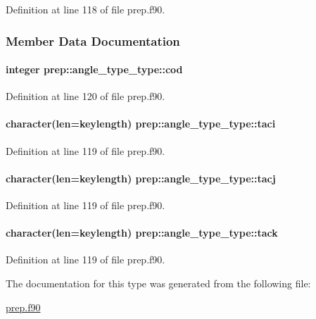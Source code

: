 Definition at line 118 of file prep.\-f90.



\subsubsection{Member Data Documentation}
\hypertarget{structprep_1_1angle__type__type_a48ee5c7c8c1e2b8ba3a29702e252b46a}{
\paragraph[{cod}]{\setlength{\rightskip}{0pt plus 5cm}integer prep\-::angle\-\_\-type\-\_\-type\-::cod}}\label{structprep_1_1angle__type__type_a48ee5c7c8c1e2b8ba3a29702e252b46a}


Definition at line 120 of file prep.\-f90.

\hypertarget{structprep_1_1angle__type__type_ac31a2b6fe772404151a3d6959862f5eb}{
\paragraph[{taci}]{\setlength{\rightskip}{0pt plus 5cm}character(len=keylength) prep\-::angle\-\_\-type\-\_\-type\-::taci}}\label{structprep_1_1angle__type__type_ac31a2b6fe772404151a3d6959862f5eb}


Definition at line 119 of file prep.\-f90.

\hypertarget{structprep_1_1angle__type__type_ad388c67349e6ca0e9de1bb11d2b6c1c1}{
\paragraph[{tacj}]{\setlength{\rightskip}{0pt plus 5cm}character(len=keylength) prep\-::angle\-\_\-type\-\_\-type\-::tacj}}\label{structprep_1_1angle__type__type_ad388c67349e6ca0e9de1bb11d2b6c1c1}


Definition at line 119 of file prep.\-f90.

\hypertarget{structprep_1_1angle__type__type_acc5fb535d5018f01dead7ef4ced2e7da}{
\paragraph[{tack}]{\setlength{\rightskip}{0pt plus 5cm}character(len=keylength) prep\-::angle\-\_\-type\-\_\-type\-::tack}}\label{structprep_1_1angle__type__type_acc5fb535d5018f01dead7ef4ced2e7da}


Definition at line 119 of file prep.\-f90.



The documentation for this type was generated from the following file\-:\begin{DoxyCompactItemize}
\item 
\hyperlink{prep_8f90}{prep.\-f90}\end{DoxyCompactItemize}
